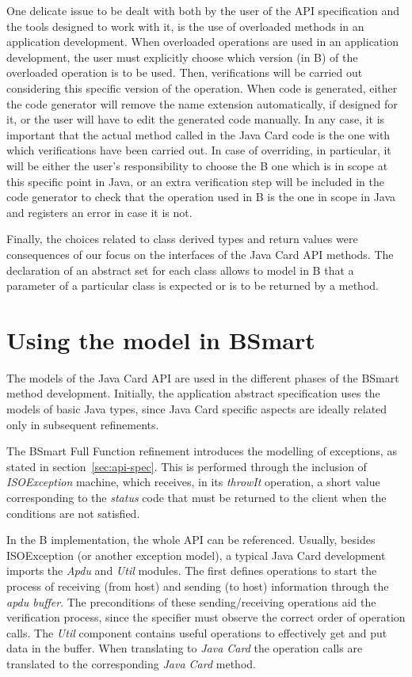 \documentclass{entcs}
\begin{document}
One delicate issue to be dealt with both by the user of the API
specification and the tools designed to work with it, is the use of
overloaded methods in an application development. When overloaded
operations are used in an application development, the user must
explicitly choose which version (in B) of the overloaded operation is to be
used. Then, verifications will be carried out considering this
specific version of the operation. When code is generated, either the
code generator will remove the name extension automatically, if
designed for it, or the user will have to edit the generated code
manually. In any case, it is important that the actual method called
in the Java Card code is the one with which verifications have been
carried out.  In case of overriding, in particular, it will be either
the user's responsibility to choose the B one which is in scope at
this specific point in Java, or an extra verification step will be
included in the code generator to check that the operation used in
B is the one in scope in Java and registers an error in case it is
not.

Finally, the choices related to class derived types and return values were consequences of our focus on the interfaces of the Java Card API methods. The declaration of an abstract set for each class allows to model in B that a parameter of a particular class is expected or is to be returned by a method. 




\section{Using the model in BSmart}\label{sec:using-the-API}

The models of the Java Card API are used in the different phases of the 
BSmart method development. Initially, the application 
abstract specification uses the models of basic Java types, 
since Java Card specific aspects are ideally related only
in subsequent refinements.

The BSmart Full Function refinement introduces the modelling of exceptions, 
as stated in section~\ref{sec:api-spec}. This is performed through  the inclusion
of \emph{ISOException} machine, which receives, in its \emph{throwIt} operation, 
a short value corresponding to the \emph{status} code that must be returned to 
the client when the conditions are not satisfied.  

In the B implementation, the whole API can be referenced. Usually,
besides ISOException (or another exception model), a typical Java Card
development imports the \emph{Apdu} and \emph{Util} modules. The first
defines operations to start the process of receiving (from host) and
sending (to host) information through the \emph{apdu buffer}. The
preconditions of these sending/receiving operations aid the
verification process, since the specifier must observe the correct
order of operation calls. The \emph{Util} component contains useful
operations to effectively get and put data in the buffer. When
translating to \emph{Java Card} the operation calls are translated
to the corresponding \emph{Java Card} method.
\end{document}
